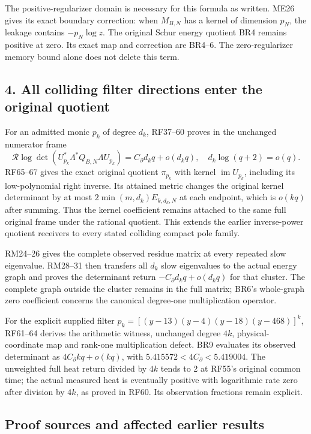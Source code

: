 \documentclass[11pt]{article}
\begin{document}
The positive-regularizer domain is necessary for this formula as written. ME26 gives its exact boundary correction: when \(M_{B,N}\) has a kernel of dimension \(p_N\), the leakage contains \(-p_N\log z\). The original Schur energy quotient BR4 remains positive at zero. Its exact map and correction are BR4--6. The zero-regularizer memory bound alone does not delete this term.

\subsection{4. All colliding filter directions enter the original quotient}\label{all-colliding-filter-directions-enter-the-original-quotient}

For an admitted monic \(p_k\) of degree \(d_k\), RF37--60 proves in the unchanged numerator frame \[
\mathcal R\log\det(U_{p_k}^*\Lambda^*Q_{B,N}\Lambda U_{p_k})
=C_\partial d_kq+o(d_kq),
\quad d_k\log(q+2)=o(q).
\tag{BR9}
\] RF65--67 gives the exact original quotient \(\pi_{p_k}\) with kernel \(\operatorname{im}U_{p_k}\), including its low-polynomial right inverse. Its attained metric changes the original kernel determinant by at most \(2\min(m,d_k)E_{k,d_k,N}\) at each endpoint, which is \(o(kq)\) after summing. Thus the kernel coefficient remains attached to the same full original frame under the rational quotient. This extends the earlier inverse-power quotient receivers to every stated colliding compact pole family.

RM24--26 gives the complete observed residue matrix at every repeated slow eigenvalue. RM28--31 then transfers all \(d_k\) slow eigenvalues to the actual energy graph and proves the determinant return \(-C_\partial d_kq+o(d_kq)\) for that cluster. The complete graph outside the cluster remains in the full matrix; BR6's whole-graph zero coefficient concerns the canonical degree-one multiplication operator.

For the explicit supplied filter \(p_k=[(y-13)(y-4)(y-18)(y-468)]^k\), RF61--64 derives the arithmetic witness, unchanged degree \(4k\), physical-coordinate map and rank-one multiplication defect. BR9 evaluates its observed determinant as \(4C_\partial kq+o(kq)\), with \(5.415572<4C_\partial<5.419004\). The unweighted full heat return divided by \(4k\) tends to 2 at RF55's original common time; the actual measured heat is eventually positive with logarithmic rate zero after division by \(4k\), as proved in RF60. Its observation fractions remain explicit.

\subsection{Proof sources and affected earlier results}\label{proof-sources-and-affected-earlier-results}
\end{document}
